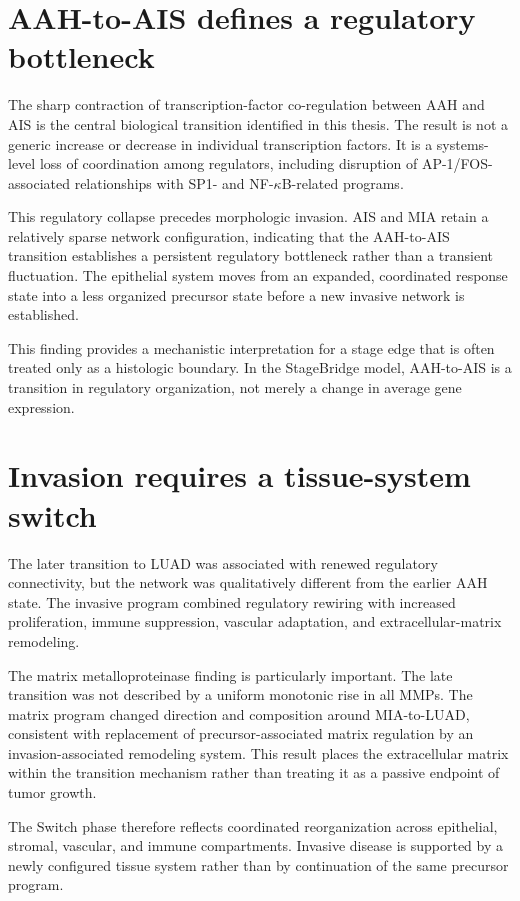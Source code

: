 \section{AAH-to-AIS defines a regulatory bottleneck}

The sharp contraction of transcription-factor co-regulation between AAH and AIS is the central biological transition identified in this thesis. The result is not a generic increase or decrease in individual transcription factors. It is a systems-level loss of coordination among regulators, including disruption of AP-1/FOS-associated relationships with SP1- and NF-$\kappa$B-related programs.

This regulatory collapse precedes morphologic invasion. AIS and MIA retain a relatively sparse network configuration, indicating that the AAH-to-AIS transition establishes a persistent regulatory bottleneck rather than a transient fluctuation. The epithelial system moves from an expanded, coordinated response state into a less organized precursor state before a new invasive network is established.

This finding provides a mechanistic interpretation for a stage edge that is often treated only as a histologic boundary. In the StageBridge model, AAH-to-AIS is a transition in regulatory organization, not merely a change in average gene expression.

\section{Invasion requires a tissue-system switch}

The later transition to LUAD was associated with renewed regulatory connectivity, but the network was qualitatively different from the earlier AAH state. The invasive program combined regulatory rewiring with increased proliferation, immune suppression, vascular adaptation, and extracellular-matrix remodeling.

The matrix metalloproteinase finding is particularly important. The late transition was not described by a uniform monotonic rise in all MMPs. The matrix program changed direction and composition around MIA-to-LUAD, consistent with replacement of precursor-associated matrix regulation by an invasion-associated remodeling system. This result places the extracellular matrix within the transition mechanism rather than treating it as a passive endpoint of tumor growth.

The Switch phase therefore reflects coordinated reorganization across epithelial, stromal, vascular, and immune compartments. Invasive disease is supported by a newly configured tissue system rather than by continuation of the same precursor program.

